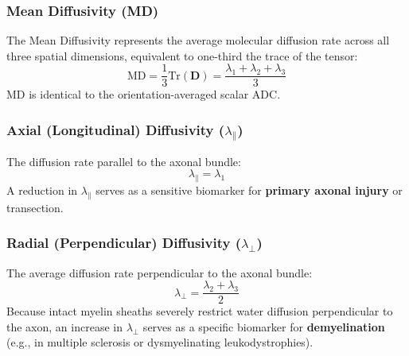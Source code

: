 \documentclass[11pt,a4paper]{article}
\begin{document}
\subsubsection{Mean Diffusivity (MD)}
The Mean Diffusivity represents the average molecular diffusion rate across all three spatial dimensions, equivalent to one-third the trace of the tensor:
\begin{equation}
    \text{MD} = \frac{1}{3} \text{Tr}(\mathbf{D}) = \frac{\lambda_1 + \lambda_2 + \lambda_3}{3}
\end{equation}
$\text{MD}$ is identical to the orientation-averaged scalar $\text{ADC}$.

\subsubsection{Axial (Longitudinal) Diffusivity (\texorpdfstring{$\lambda_\parallel$}{lambda parallel})}
The diffusion rate parallel to the axonal bundle:
\begin{equation}
    \lambda_\parallel = \lambda_1
\end{equation}
A reduction in $\lambda_\parallel$ serves as a sensitive biomarker for \textbf{primary axonal injury} or transection.

\subsubsection{Radial (Perpendicular) Diffusivity (\texorpdfstring{$\lambda_\perp$}{lambda perp})}
The average diffusion rate perpendicular to the axonal bundle:
\begin{equation}
    \lambda_\perp = \frac{\lambda_2 + \lambda_3}{2}
\end{equation}
Because intact myelin sheaths severely restrict water diffusion perpendicular to the axon, an increase in $\lambda_\perp$ serves as a specific biomarker for \textbf{demyelination} (e.g., in multiple sclerosis or dysmyelinating leukodystrophies).
\end{document}
